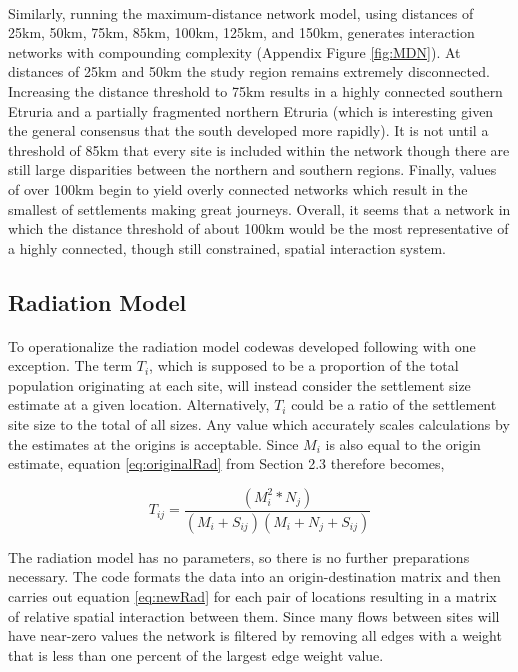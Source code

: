 \documentclass[12pt,a4paper]{thesis}
\begin{document}
\paragraph{}
Similarly, running the maximum-distance network model, using distances of 25km, 50km, 75km, 85km, 100km, 125km, and 150km, generates interaction networks with compounding complexity (Appendix Figure \ref{fig:MDN}). At distances of 25km and 50km the study region remains extremely disconnected. Increasing the distance threshold to 75km results in a highly connected southern Etruria and a partially fragmented northern Etruria (which is interesting given the general consensus that the south developed more rapidly). It is not until a threshold of 85km that every site is included within the network though there are still large disparities between the northern and southern regions. Finally, values of over 100km begin to yield overly connected networks which result in the smallest of settlements making great journeys. Overall, it seems that a network in which the distance threshold of about 100km would be the most representative of a highly connected, though still constrained, spatial interaction system.  



\subsection{Radiation Model}
\paragraph{}
To operationalize the radiation model code\footnotemark was developed following \cite{Bar12} with one exception. The term  $T_{i}$, which is supposed to be a proportion of the total population originating at each site, will instead consider the settlement size estimate at a given location. Alternatively, $T_{i}$ could be a ratio of the settlement site size to the total of all sizes. Any value which accurately scales calculations by the estimates at the origins is acceptable. Since $M_{i}$ is also equal to the origin estimate, equation \ref{eq:originalRad} from Section 2.3 therefore becomes,
						
				
				\begin{equation}						
				T_{ij} = \frac{(M_{i}^2*N_{j})}{(M_{i}+S_{ij})(M_{i}+N_{j}+S_{ij})}
				\label{eq:newRad}	
				\end{equation}
						
The radiation model has no parameters, so there is no further preparations necessary. The code formats the data into an origin-destination matrix and then  carries out equation \ref{eq:newRad} for each pair of locations resulting in a matrix of relative spatial interaction between them. Since many flows between sites will have near-zero values the network is filtered by removing all edges with a weight that is less than one percent of the largest edge weight value. 
\end{document}
